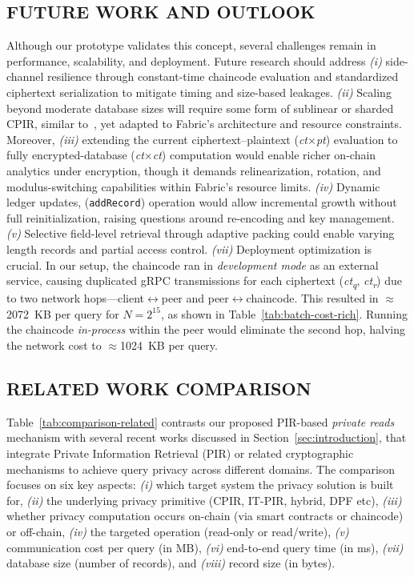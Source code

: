 \documentclass{ieeetj}
\begin{document}
\subsection{FUTURE WORK AND OUTLOOK}
Although our prototype validates this concept, several challenges remain in performance, scalability, and deployment.
Future research should address \emph{(i)} side-channel resilience through constant-time chaincode evaluation and standardized 
ciphertext serialization to mitigate timing and size-based leakages. 
\emph{(ii)} Scaling beyond moderate database sizes will require some form of sublinear or sharded CPIR, 
similar to~\cite{simplepir_2023,piano_pir_2024,hintless_pir_2024,ypir_2024}, yet adapted to Fabric’s architecture and resource constraints.
Moreover, \emph{(iii)} extending the current ciphertext–plaintext (\emph{ct}×\emph{pt}) evaluation to fully encrypted-database (\emph{ct}×\emph{ct}) 
computation would enable richer on-chain analytics under encryption, though it demands relinearization, rotation, and modulus-switching 
capabilities within Fabric’s resource limits. 
\emph{(iv)} Dynamic ledger updates, (\texttt{addRecord}) operation would allow incremental growth without full reinitialization,
raising questions around re-encoding and key management. 
\emph{(v)} Selective field-level retrieval through adaptive packing could enable varying length records and partial access control.
\emph{(vii)} Deployment optimization is crucial. In our setup, the chaincode ran in \emph{development mode} as an external service, 
causing duplicated gRPC transmissions for each ciphertext (\emph{ct\textsubscript{q}}, \emph{ct\textsubscript{r}}) due to two network 
hops—client$\leftrightarrow$peer and peer$\leftrightarrow$chaincode. This resulted in $\approx$2072~KB per query for $N=2^{15}$, 
as shown in Table~\ref{tab:batch-cost-rich}. Running the chaincode \emph{in-process} within the peer would eliminate the second hop, 
halving the network cost to $\approx$1024~KB per query.

\subsection{RELATED WORK COMPARISON}

Table~\ref{tab:comparison-related} contrasts our proposed PIR-based \emph{private reads} mechanism with several recent works 
discussed in Section~\ref{sec:introduction},
that integrate Private Information Retrieval (PIR) or related cryptographic mechanisms 
to achieve query privacy across different domains.
The comparison focuses on six key aspects:
\emph{(i)} which target system the privacy solution is built for,
\emph{(ii)} the underlying privacy primitive (CPIR, IT-PIR, hybrid, DPF etc),
\emph{(iii)} whether privacy computation occurs on-chain (via smart contracts or chaincode) or off-chain,
\emph{(iv)} the targeted operation (read-only or read/write),
\emph{(v)} communication cost per query (in MB),
\emph{(vi)} end-to-end query time (in ms),
\emph{(vii)} database size (number of records), and
\emph{(viii)} record size (in bytes).
\end{document}
